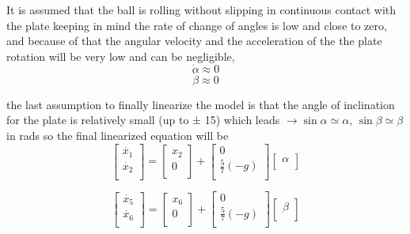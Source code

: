 It is assumed that the ball is rolling without slipping in continuous contact with the plate keeping in mind the rate of change of angles is low and close to zero, and because of that the angular velocity and the acceleration of the the plate rotation will be very low and can be negligible,
\[ \dot{\alpha} \approx 0 \]\[ \dot{\beta} \approx 0  \]

the last assumption to finally linearize the model is that the angle of inclination for the plate is relatively small (up to ± 15) which leads $\longrightarrow  \sin{\alpha} \simeq \alpha, \, \sin{\beta} \simeq \beta$ in rads so the final linearized equation will be
\begin{equation}    
\begin{bmatrix}
\dot{x_1}\\
\dot{x_2}\\
\end{bmatrix}
=
\begin{bmatrix}
x_2\\
0\\
\end{bmatrix}
+ 
\begin{bmatrix}
0 \\
\frac{5}{7}(-g) \\
\end{bmatrix}
\begin{bmatrix}
\alpha \\
\end{bmatrix}
\end{equation}

\begin{equation}
\begin{bmatrix}
\dot{x_5}\\
\dot{x_6}\\
\end{bmatrix}
=
\begin{bmatrix}
x_6\\
0\\
\end{bmatrix}
+ 
\begin{bmatrix}
0  \\
\frac{5}{7}(-g)  \\
\end{bmatrix}
\begin{bmatrix}
\beta  \\
\end{bmatrix}
\end{equation}

